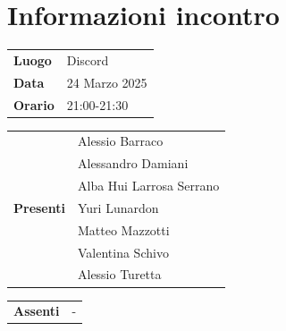 \section{Informazioni incontro}
\vspace{0.25cm}
\begin{tabular}{p{1.75cm} | l}
    \textbf{Luogo} & Discord\\
    \textbf{Data} & 24 Marzo 2025\\
    \textbf{Orario} & 21:00-21:30\\
\end{tabular}

\vspace{0.5cm}
\noindent
\begin{tabular}{p{1.75cm} | l}
    \multirow{7}{*}{\textbf{Presenti}}
        & Alessio Barraco\\
        & Alessandro Damiani\\
        & Alba Hui Larrosa Serrano\\
        & Yuri Lunardon\\
        & Matteo Mazzotti\\
        & Valentina Schivo\\
        & Alessio Turetta
\end{tabular}

\vspace{0.5cm}
\noindent
\begin{tabular}{p{1.75cm} | l}
    \multirow{1}{*}{\textbf{Assenti}}
        & -\\
\end{tabular}